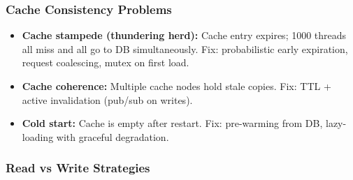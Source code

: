 \documentclass[11pt]{article}
\providecommand{\tightlist}{\setlength{\itemsep}{1pt}\setlength{\parskip}{0pt}}
\begin{document}
\subsubsection{Cache Consistency Problems}\label{cache-consistency-problems}

\begin{itemize}
\tightlist
\item
  \textbf{Cache stampede (thundering herd):} Cache entry expires; 1000 threads all miss and all go to DB simultaneously. Fix: probabilistic early expiration, request coalescing, mutex on first load.
\item
  \textbf{Cache coherence:} Multiple cache nodes hold stale copies. Fix: TTL + active invalidation (pub/sub on writes).
\item
  \textbf{Cold start:} Cache is empty after restart. Fix: pre-warming from DB, lazy-loading with graceful degradation.
\end{itemize}

\subsubsection{Read vs Write Strategies}\label{read-vs-write-strategies}
\end{document}
